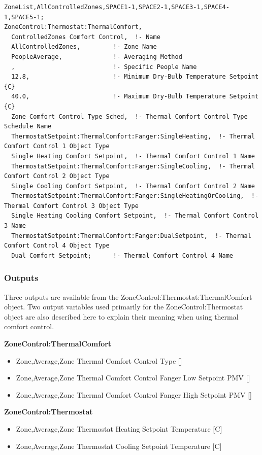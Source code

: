 \begin{lstlisting}
ZoneList,AllControlledZones,SPACE1-1,SPACE2-1,SPACE3-1,SPACE4-1,SPACE5-1;
ZoneControl:Thermostat:ThermalComfort,
  ControlledZones Comfort Control,  !- Name
  AllControlledZones,         !- Zone Name
  PeopleAverage,              !- Averaging Method
  ,                           !- Specific People Name
  12.8,                       !- Minimum Dry-Bulb Temperature Setpoint {C}
  40.0,                       !- Maximum Dry-Bulb Temperature Setpoint {C}
  Zone Comfort Control Type Sched,  !- Thermal Comfort Control Type Schedule Name
  ThermostatSetpoint:ThermalComfort:Fanger:SingleHeating,  !- Thermal Comfort Control 1 Object Type
  Single Heating Comfort Setpoint,  !- Thermal Comfort Control 1 Name
  ThermostatSetpoint:ThermalComfort:Fanger:SingleCooling,  !- Thermal Comfort Control 2 Object Type
  Single Cooling Comfort Setpoint,  !- Thermal Comfort Control 2 Name
  ThermostatSetpoint:ThermalComfort:Fanger:SingleHeatingOrCooling,  !- Thermal Comfort Control 3 Object Type
  Single Heating Cooling Comfort Setpoint,  !- Thermal Comfort Control 3 Name
  ThermostatSetpoint:ThermalComfort:Fanger:DualSetpoint,  !- Thermal Comfort Control 4 Object Type
  Dual Comfort Setpoint;      !- Thermal Comfort Control 4 Name
\end{lstlisting}

\subsubsection{Outputs}\label{outputs-3-024}

Three outputs are available from the ZoneControl:Thermostat:ThermalComfort object. Two output variables used primarily for the ZoneControl:Thermostat object are also described here to explain their meaning when using thermal comfort control.

\textbf{ZoneControl:ThermalComfort}

\begin{itemize}
\item
  Zone,Average,Zone Thermal Comfort Control Type {[]}
\item
  Zone,Average,Zone Thermal Comfort Control Fanger Low Setpoint PMV {[]}
\item
  Zone,Average,Zone Thermal Comfort Control Fanger High Setpoint PMV {[]}
\end{itemize}

\textbf{ZoneControl:Thermostat}

\begin{itemize}
\item
  Zone,Average,Zone Thermostat Heating Setpoint Temperature {[}C{]}
\item
  Zone,Average,Zone Thermostat Cooling Setpoint Temperature {[}C{]}
\end{itemize}

